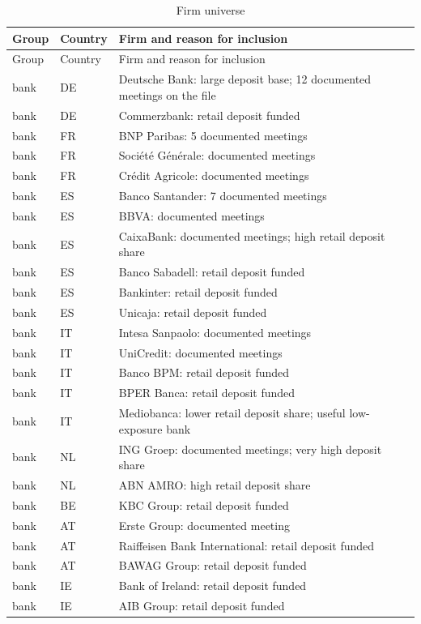 \begin{longtable}{llp{7.2cm}}
\caption{Firm universe}\label{tab:firms}\\
\toprule Group & Country & Firm and reason for inclusion \\ \midrule
\endfirsthead \toprule Group & Country & Firm and reason for inclusion \\ \midrule \endhead
bank & DE & Deutsche Bank: large deposit base; 12 documented meetings on the file \\
bank & DE & Commerzbank: retail deposit funded \\
bank & FR & BNP Paribas: 5 documented meetings \\
bank & FR & Soci\'et\'e G\'en\'erale: documented meetings \\
bank & FR & Cr\'edit Agricole: documented meetings \\
bank & ES & Banco Santander: 7 documented meetings \\
bank & ES & BBVA: documented meetings \\
bank & ES & CaixaBank: documented meetings; high retail deposit share \\
bank & ES & Banco Sabadell: retail deposit funded \\
bank & ES & Bankinter: retail deposit funded \\
bank & ES & Unicaja: retail deposit funded \\
bank & IT & Intesa Sanpaolo: documented meetings \\
bank & IT & UniCredit: documented meetings \\
bank & IT & Banco BPM: retail deposit funded \\
bank & IT & BPER Banca: retail deposit funded \\
bank & IT & Mediobanca: lower retail deposit share; useful low-exposure bank \\
bank & NL & ING Groep: documented meetings; very high deposit share \\
bank & NL & ABN AMRO: high retail deposit share \\
bank & BE & KBC Group: retail deposit funded \\
bank & AT & Erste Group: documented meeting \\
bank & AT & Raiffeisen Bank International: retail deposit funded \\
bank & AT & BAWAG Group: retail deposit funded \\
bank & IE & Bank of Ireland: retail deposit funded \\
bank & IE & AIB Group: retail deposit funded \\

\end{longtable}
